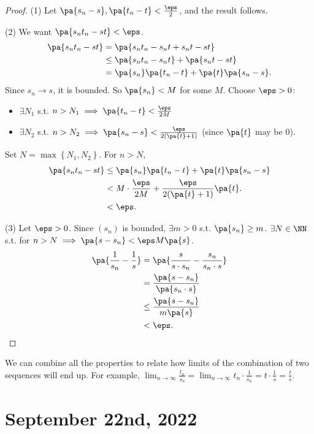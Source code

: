\documentclass[11pt]{scrartcl}
\numberwithin{equation}{section}
\begin{document}
\begin{proof}
    (1) Let $\pa{s_n-s},\pa{t_n-t}<\frac{\eps}{2}$, and the result follows.

    (2) We want $\pa{s_nt_n -st} < \eps$.
    \begin{align*}
        \pa{s_nt_n -st} &= \pa{s_nt_n-s_nt+s_nt-st} \\
        &\leq \pa{s_nt_n-s_nt}+\pa{s_nt-st} \\ 
        &= \pa{s_n}\pa{t_n-t}+\pa{t}\pa{s_n-s}.
    \end{align*}
    Since $s_n\rightarrow s$, it is bounded. So $\pa{s_n}<M$ for some $M$.
    Choose $\eps>0$:
    \begin{itemize}
        \item $\exists N_1$ s.t. $n>N_1\implies \pa{t_n-t}<\frac{\eps}{2M}$
        \item $\exists N_2$ s.t. $n>N_2\implies \pa{s_n-s}<\frac{\eps}{2 (\pa{t} + 1)}$ (since $\pa{t}$ may be $0$).
    \end{itemize}
    Set $N=\max \left\{N_1,N_2\right\}$. For $n>N$,
    \begin{align*}
        \pa{s_nt_n -st} &\leq\pa{s_n}\pa{t_n-t}+\pa{t}\pa{s_n-s} \\
        &< M\cdot\frac{\eps}{2M} +  \frac{\eps}{2(\pa{t}+1)}\pa{t}. \\
        &< \eps.
    \end{align*}
    
    (3) Let $\eps>0$. Since $(s_n)$ is bounded, 
    $\exists m>0$ s.t. $\pa{s_n}\geq m$.
    $\exists N \in \NN$ s.t. for $n>N \implies \pa{s-s_n} < \eps M \pa{s}$.
    \begin{align*}
        \pa{\frac{1}{s_n}-\frac{1}{s}} &= \pa{\frac{s}{s\cdot s_n}-\frac{s_n}{s_n\cdot s}} \\
        &=\frac{\pa{s-s_n}}{\pa{s_n\cdot s}} \\
        &\leq \frac{\pa{s-s_n}}{m\pa{s}} \\
        &< \eps. \qedhere
    \end{align*}
\end{proof}

We can combine all the properties to relate how limits of the 
combination of two sequences will end up.
For example, $\lim_{n\rightarrow\infty} \frac{t_n}{s_n} = \lim_{n\rightarrow\infty} t_n \cdot\frac{1}{s_n} = t \cdot \frac{1}{s} = \frac{t}{s}$.

\clearpage
\section{September 22nd, 2022}
\end{document}

